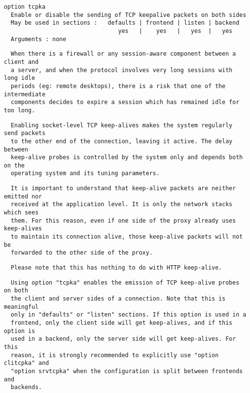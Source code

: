 \begin{verbatim}
option tcpka
  Enable or disable the sending of TCP keepalive packets on both sides
  May be used in sections :   defaults | frontend | listen | backend
                                 yes   |    yes   |   yes  |   yes
  Arguments : none
\end{verbatim}

\begin{verbatim}
  When there is a firewall or any session-aware component between a client and
  a server, and when the protocol involves very long sessions with long idle
  periods (eg: remote desktops), there is a risk that one of the intermediate
  components decides to expire a session which has remained idle for too long.
\end{verbatim}

\begin{verbatim}
  Enabling socket-level TCP keep-alives makes the system regularly send packets
  to the other end of the connection, leaving it active. The delay between
  keep-alive probes is controlled by the system only and depends both on the
  operating system and its tuning parameters.
\end{verbatim}

\begin{verbatim}
  It is important to understand that keep-alive packets are neither emitted nor
  received at the application level. It is only the network stacks which sees
  them. For this reason, even if one side of the proxy already uses keep-alives
  to maintain its connection alive, those keep-alive packets will not be
  forwarded to the other side of the proxy.
\end{verbatim}

\begin{verbatim}
  Please note that this has nothing to do with HTTP keep-alive.
\end{verbatim}

\begin{verbatim}
  Using option "tcpka" enables the emission of TCP keep-alive probes on both
  the client and server sides of a connection. Note that this is meaningful
  only in "defaults" or "listen" sections. If this option is used in a
  frontend, only the client side will get keep-alives, and if this option is
  used in a backend, only the server side will get keep-alives. For this
  reason, it is strongly recommended to explicitly use "option clitcpka" and
  "option srvtcpka" when the configuration is split between frontends and
  backends.
\end{verbatim}

